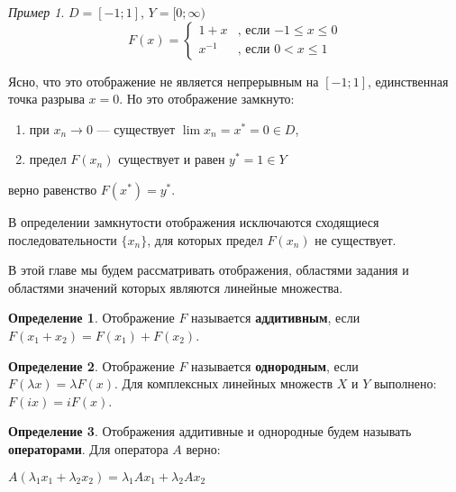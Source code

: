\documentclass[12pt,a4paper,titlepage,oneside]{book}
\theoremstyle{definition}
\newtheorem*{definition}{Определение}
\theoremstyle{plain}
\theoremstyle{remark}
\theoremstyle{remark}
\newtheorem*{example}{Пример}
\theoremstyle{remark}
\theoremstyle{remark}
\theoremstyle{plain}
\theoremstyle{plain}
\begin{document}
\begin{example}
$D=[-1;1]$, $Y=[0;\infty)$
\begin{equation*}
F(x) = 
\begin{cases}
   1+x &\text{, если $-1\leqslant x \leqslant 0$}\\
   x^{-1} &\text{, если $0< x \leqslant 1$}
\end{cases}
\end{equation*}

Ясно, что это отображение не является непрерывным на $[-1;1]$, единственная точка разрыва $x=0$. Но это отображение замкнуто:

\begin{enumerate}

 \item при $x_n \to 0$ --- существует $\lim x_n= x^*=0 \in D$,
 
 \item предел $F(x_n)$ существует и равен $y^*=1 \in Y$
 
\end{enumerate}
верно равенство $F(x^*)=y^*$.

\end{example}

В определении замкнутости отображения исключаются сходящиеся последовательности $\lbrace x_n \rbrace$, для которых предел $F(x_n)$ не существует.

В этой главе мы будем рассматривать отображения, областями задания и областями значений которых являются линейные множества.

\begin{definition} Отображение $F$ называется \textbf{аддитивным}, если $F(x_1+x_2)=F(x_1)+F(x_2)$.
\end{definition}

\begin{definition} Отображение $F$ называется \textbf{однородным}, если $F(\lambda x)=\lambda F(x)$. Для комплексных линейных множеств $X$ и $Y$ выполнено: $F(ix)=iF(x)$.
\end{definition}

\begin{definition} Отображения аддитивные и однородные будем называть \textbf{операторами}. Для оператора $A$ верно:

\begin{center}
	$A(\lambda_1x_1+\lambda_2x_2)=\lambda_1Ax_1+\lambda_2Ax_2$
\end{center}

\end{definition}
\end{document}
